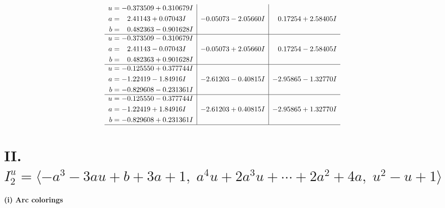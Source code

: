 \documentclass[1p]{elsarticle_modified}
\theoremstyle{definition}
\begin{document}
$$\begin{array}{c|c|c}
\begin{aligned}
u &= -0.373509 + 0.310679 I \\
a &= \phantom{-}2.41143 + 0.07043 I \\
b &= \phantom{-}0.482363 - 0.901628 I\end{aligned}
 & -0.05073 - 2.05660 I & \phantom{-}0.17254 + 2.58405 I \\ \hline\begin{aligned}
u &= -0.373509 - 0.310679 I \\
a &= \phantom{-}2.41143 - 0.07043 I \\
b &= \phantom{-}0.482363 + 0.901628 I\end{aligned}
 & -0.05073 + 2.05660 I & \phantom{-}0.17254 - 2.58405 I \\ \hline\begin{aligned}
u &= -0.125550 + 0.377744 I \\
a &= -1.22419 - 1.84916 I \\
b &= -0.829608 - 0.231361 I\end{aligned}
 & -2.61203 - 0.40815 I & -2.95865 - 1.32770 I \\ \hline\begin{aligned}
u &= -0.125550 - 0.377744 I \\
a &= -1.22419 + 1.84916 I \\
b &= -0.829608 + 0.231361 I\end{aligned}
 & -2.61203 + 0.40815 I & -2.95865 + 1.32770 I\\
 \hline 
 \end{array}$$\newpage\newpage\renewcommand{\arraystretch}{1}
\centering \section*{II. $I^u_{2}= \langle - a^3-3 a u+b+3 a+1,\;a^4 u+2 a^3 u+\cdots+2 a^2+4 a,\;u^2- u+1 \rangle$}
\flushleft \textbf{(i) Arc colorings}\\
\end{document}
